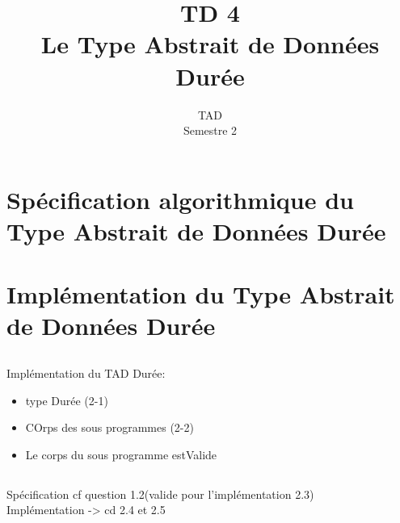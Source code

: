 \documentclass{article}
\title{TD 4\\ Le Type Abstrait de Données Durée}
\date{TAD\\ Semestre 2}
\begin{document}
	\maketitle
	\section{Spécification algorithmique du Type Abstrait de Données Durée}
		\subsection{}
			
		\subsection{}
			
%		
	\section{Implémentation du Type Abstrait de Données Durée}
		\subsection{}
			
		\subsection{}
			
		\subsection{}
			Implémentation du TAD Durée: 
			\begin{itemize}
				\item type Durée (2-1)
				\item COrps des sous programmes (2-2)
				\item Le corps du sous programme estValide 
			\end{itemize}	
			
		\subsection{}
			
		\subsection{}
			
		\subsection{}
			Spécification cf question 1.2(valide pour l'implémentation 2.3)\\
			Implémentation -> cd 2.4 et 2.5
			
\end{document}
